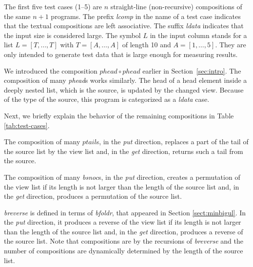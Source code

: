 The first five test cases
(1--5) 
are $n$ straight-line (non-recursive) compositions of the same $n + 1$ 
programs.
The prefix \textit{lcomp} in the name of a test case indicates that the textual compositions are left associative.
The suffix \textit{ldata} indicates that the input size is considered large. The symbol $L$ in the input column 
stands for a list $L = [T,\ldots,T]$ with
$T = [A,\ldots,A]$ of length 10
and
$A = [1,\ldots,5]$. 
They are only intended to generate test data that is large enough for 
measuring
results. 

We introduced the composition $phead \circ phead$ earlier in Section~\ref{sec:intro}. The composition of many \textit{phead}s 
works similarly. The head of a head element inside a 
deeply nested list, which 
is the source, 
is updated by the changed view. Because of the type of the source, this program is 
categorized as a \textit{ldata} case. 

Next, we briefly explain the behavior of the remaining compositions in 
\mbox{Table\,\ref{tab:test-cases}.}%

The composition of many $ptail$s, in the \textit{put} direction, replaces a part of the tail of the source list by the view list and, in the \textit{get} direction, returns such a tail from the source.

The composition of many \textit{bsnoc}s, in the \textit{put} direction, creates a permutation of the view list if its length is not larger than the length of the source list and, in the \textit{get} direction, produces a permutation of the source list.

\textit{breverse} is defined in terms of \textit{bfoldr}, that appeared in Section \ref{sect:minbigul}. In the \textit{put} direction, it produces a reverse of the view list if its length is not larger than the length of the source list and, in the \textit{get} direction, produces a reverse of the source list. Note that compositions are by the recursions of \textit{breverse} and 
the number of compositions are dynamically determined by the length of the source list.

